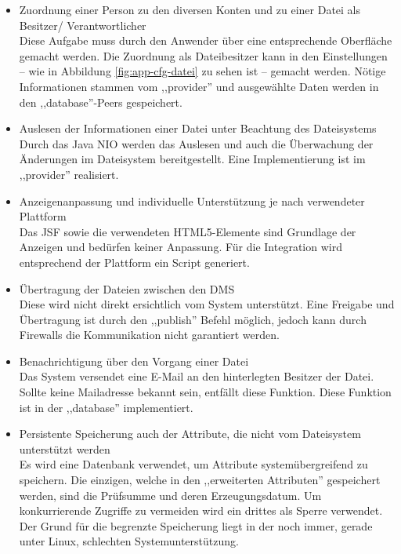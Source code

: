 \documentclass[oneside, ngerman, toc=bibliography,bibliography=totoc,listof=entryprefix, open=right,numbers=noenddot,fontsize=12pt]{scrbook}
\begin{document}
\begin{itemize}
	\item Zuordnung einer Person zu den diversen Konten und zu einer Datei als Besitzer/ Verantwortlicher\\
	Diese Aufgabe muss durch den Anwender über eine entsprechende Oberfläche gemacht werden. Die Zuordnung als Dateibesitzer kann in den Einstellungen -- wie in Abbildung \ref{fig:app-cfg-datei} zu sehen ist -- gemacht werden. Nötige Informationen  stammen vom ,,provider'' und ausgewählte Daten werden in den ,,database''-Peers gespeichert.
	
	\item Auslesen der Informationen einer Datei unter Beachtung des Dateisystems \\
	Durch das Java NIO werden das Auslesen und auch die Überwachung der Änderungen im Dateisystem bereitgestellt.
    Eine Implementierung ist im ,,provider'' realisiert.

    \item Anzeigenanpassung und individuelle Unterstützung je nach verwendeter Plattform \\
	Das JSF sowie die verwendeten HTML5-Elemente sind Grundlage der Anzeigen und bedürfen keiner Anpassung. Für die Integration wird entsprechend der Plattform ein Script generiert.
	\item Übertragung der Dateien zwischen den DMS\\
   Diese wird nicht direkt ersichtlich  vom System unterstützt. Eine Freigabe und Übertragung ist durch den ,,publish'' Befehl möglich, jedoch kann durch Firewalls die Kommunikation nicht garantiert werden.  
	\item Benachrichtigung über den Vorgang einer Datei\\
	Das System versendet eine E-Mail an den hinterlegten Besitzer der Datei. Sollte keine Mailadresse bekannt sein, entfällt diese Funktion. Diese Funktion ist in der ,,database'' implementiert.
	\item Persistente Speicherung auch der Attribute, die nicht vom Dateisystem unterstützt werden\\
	Es wird eine Datenbank verwendet, um Attribute systemübergreifend zu speichern.
    Die einzigen, welche in den ,,erweiterten Attributen'' gespeichert werden, sind die Prüfsumme und deren Erzeugungsdatum. Um konkurrierende Zugriffe zu vermeiden wird ein drittes als Sperre verwendet. Der Grund für die begrenzte Speicherung liegt in der noch immer, gerade unter Linux, schlechten Systemunterstützung.


\end{itemize}
\end{document}
